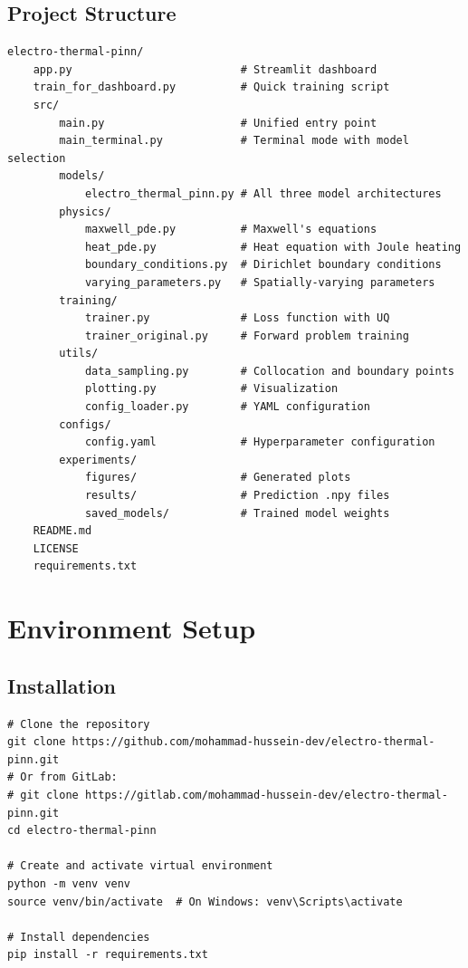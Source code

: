 \documentclass[11pt,a4paper]{article}
\begin{document}
\subsection{Project Structure}

\begin{lstlisting}
electro-thermal-pinn/
    app.py                          # Streamlit dashboard
    train_for_dashboard.py          # Quick training script
    src/
        main.py                     # Unified entry point
        main_terminal.py            # Terminal mode with model selection
        models/
            electro_thermal_pinn.py # All three model architectures
        physics/
            maxwell_pde.py          # Maxwell's equations
            heat_pde.py             # Heat equation with Joule heating
            boundary_conditions.py  # Dirichlet boundary conditions
            varying_parameters.py   # Spatially-varying parameters
        training/
            trainer.py              # Loss function with UQ
            trainer_original.py     # Forward problem training
        utils/
            data_sampling.py        # Collocation and boundary points
            plotting.py             # Visualization
            config_loader.py        # YAML configuration
        configs/
            config.yaml             # Hyperparameter configuration
        experiments/
            figures/                # Generated plots
            results/                # Prediction .npy files
            saved_models/           # Trained model weights
    README.md
    LICENSE
    requirements.txt
\end{lstlisting}

\section{Environment Setup}

\subsection{Installation}

\begin{lstlisting}
# Clone the repository
git clone https://github.com/mohammad-hussein-dev/electro-thermal-pinn.git
# Or from GitLab:
# git clone https://gitlab.com/mohammad-hussein-dev/electro-thermal-pinn.git
cd electro-thermal-pinn

# Create and activate virtual environment
python -m venv venv
source venv/bin/activate  # On Windows: venv\Scripts\activate

# Install dependencies
pip install -r requirements.txt
\end{lstlisting}
\end{document}
